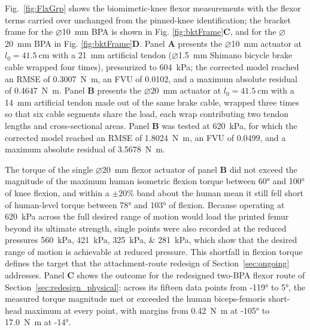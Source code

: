 Fig.~\ref{fig:FlxGrp} shows the biomimetic-knee flexor measurements with the flexor terms carried over unchanged from the pinned-knee identification; the bracket frame for the $\diameter$\qty{10}{\mm} BPA is shown in Fig. \ref{fig:bktFrame}\textbf{C}, and for the $\diameter$\qty{20}{\mm} BPA in Fig. \ref{fig:bktFrame}\textbf{D}. Panel \textbf{A} presents the $\diameter$\qty{10}{\mm} actuator at $l_{0}=\qty{41.5}{\cm}$ with a \qty{21}{\mm} artificial tendon ($\diameter$\qty{1.5}{\mm} Shimano bicycle brake cable wrapped four times), pressurized to \qty{604}{\kPa}; the corrected model reached an RMSE of \qty{0.3007}{\newton\meter}, an FVU of 0.0102, and a maximum absolute residual of \qty{0.4647}{\newton\meter}. Panel \textbf{B} presents the $\diameter$\qty{20}{\mm} actuator at $l_{0}=\qty{41.5}{\cm}$ with a \qty{14}{\mm} artificial tendon made out of the same brake cable, wrapped three times so that six cable segments share the load, each wrap contributing two tendon lengths and cross-sectional areas. Panel \textbf{B} was tested at \qty{620}{\kPa}, for which the corrected model reached an RMSE of \qty{1.8024}{\newton\meter}, an FVU of 0.0499, and a maximum absolute residual of \qty{3.5678}{\newton\meter}.

The torque of the single $\diameter$\qty{20}{\mm} flexor actuator of panel \textbf{B} did not exceed the magnitude of the maximum human isometric flexion torque between \ang{60} and \ang{100} of knee flexion, and within a $\pm 20\%$ band about the human mean it still fell short of human-level torque between \ang{78} and \ang{103} of flexion. Because operating at \qty{620}{\kPa} across the full desired range of motion would load the printed femur beyond its ultimate strength, single points were also recorded at the reduced pressures \qtylist{560;421;325;281}{\kPa}, which show that the desired range of motion is achievable at reduced pressure. This shortfall in flexion torque defines the target that the attachment-route redesign of Section~\ref{sec:ongoing} addresses. Panel \textbf{C} shows the outcome for the redesigned two-BPA flexor route of Section~\ref{sec:redesign_physical}: across its fifteen data points from \ang{-119} to \ang{5}, the measured torque magnitude met or exceeded the human biceps-femoris short-head maximum at every point, with margins from \qty{0.42}{\newton\meter} at \ang{-105} to \qty{17.0}{\newton\meter} at \ang{-14}.

